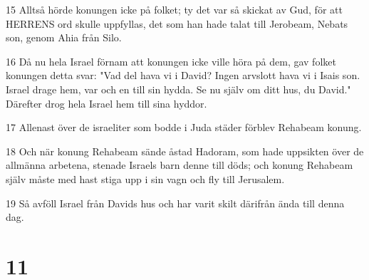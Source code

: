 \par 15 Alltså hörde konungen icke på folket; ty det var så skickat av Gud, för att HERRENS ord skulle uppfyllas, det som han hade talat till Jerobeam, Nebats son, genom Ahia från Silo.
\par 16 Då nu hela Israel förnam att konungen icke ville höra på dem, gav folket konungen detta svar: "Vad del hava vi i David? Ingen arvslott hava vi i Isais son. Israel drage hem, var och en till sin hydda. Se nu själv om ditt hus, du David." Därefter drog hela Israel hem till sina hyddor.
\par 17 Allenast över de israeliter som bodde i Juda städer förblev Rehabeam konung.
\par 18 Och när konung Rehabeam sände åstad Hadoram, som hade uppsikten över de allmänna arbetena, stenade Israels barn denne till döds; och konung Rehabeam själv måste med hast stiga upp i sin vagn och fly till Jerusalem.
\par 19 Så avföll Israel från Davids hus och har varit skilt därifrån ända till denna dag.

\chapter{11}

